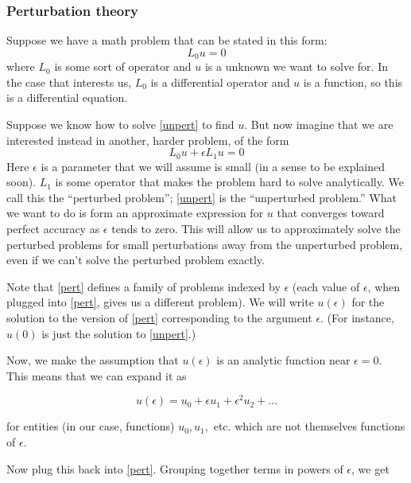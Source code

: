 \documentclass[11pt]{book}
\begin{document}
\subsubsection{Perturbation theory}

Suppose we have a math problem that can be stated in this form:
\begin{equation}L_0 u = 0\label{unpert}\end{equation}
where $L_0$ is some sort of operator and $u$ is a unknown we want to solve for.  In the case that interests us, $L_0$ is a differential operator and $u$ is a function, so this is a differential equation.

Suppose we know how to solve \eqref{unpert} to find $u$.  But now imagine that we are interested instead in another, harder problem, of the form
\begin{equation}L_0 u + \epsilon L_1 u = 0\label{pert}\end{equation}
Here $\epsilon$ is a parameter that we will assume is small (in a sense to be explained soon).  $L_1$ is some operator that makes the problem hard to solve analytically.  We call this the ``perturbed problem''; \eqref{unpert} is the ``unperturbed problem.''  What we want to do is form an approximate expression for $u$ that converges toward perfect accuracy as $\epsilon$ tends to zero.  This will allow us to approximately solve the perturbed problems for small perturbations away from the unperturbed problem, even if we can't solve the perturbed problem exactly.

Note that \eqref{pert} defines a family of problems indexed by $\epsilon$ (each value of $\epsilon$, when plugged into \eqref{pert}, gives us a different problem).  We will write $u(\epsilon)$ for the solution to the version of \eqref{pert} corresponding to the argument $\epsilon$.  (For instance, $u(0)$ is just the solution to \eqref{unpert}.)

Now, we make the assumption that $u(\epsilon)$ is an analytic function near $\epsilon = 0$.  This means that we can expand it as

\begin{equation}u(\epsilon) = u_0 + \epsilon u_1 + \epsilon^2 u_2 + \ldots\end{equation}

for entities (in our case, functions) $u_0, u_1,$ etc. which are not themselves functions of $\epsilon$.

Now plug this back into \eqref{pert}.  Grouping together terms in powers of $\epsilon$, we get
\end{document}
